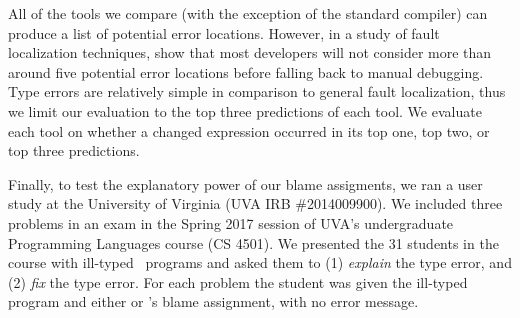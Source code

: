 

All of the tools we compare (with the exception of the standard \ocaml
compiler) can produce a list of potential error locations.
%
However, in a study of fault localization techniques,
\citet{Kochhar2016-oc} show that most developers will not consider more
than around five potential error locations before falling back to manual
debugging.
%
Type errors are relatively simple in comparison to general fault
localization, thus we limit our evaluation to the top three predictions
of each tool.
%
We evaluate each tool on whether a changed expression occurred in its
top one, top two, or top three predictions.

Finally, to test the explanatory power of our blame assigments, we
ran a user study at the University of Virginia (UVA IRB \#2014009900).
%
We included three problems in an exam in the Spring 2017 session of UVA's
undergraduate Programming Languages course (CS 4501).
%
We presented the 31 students in the course with ill-typed \ocaml\
programs and asked them to
%
(1) \emph{explain} the type error, and
%
(2) \emph{fix} the type error.
%
For each problem the student was given the ill-typed program and
either \sherrloc or \toolname's blame assignment, with no error message.








